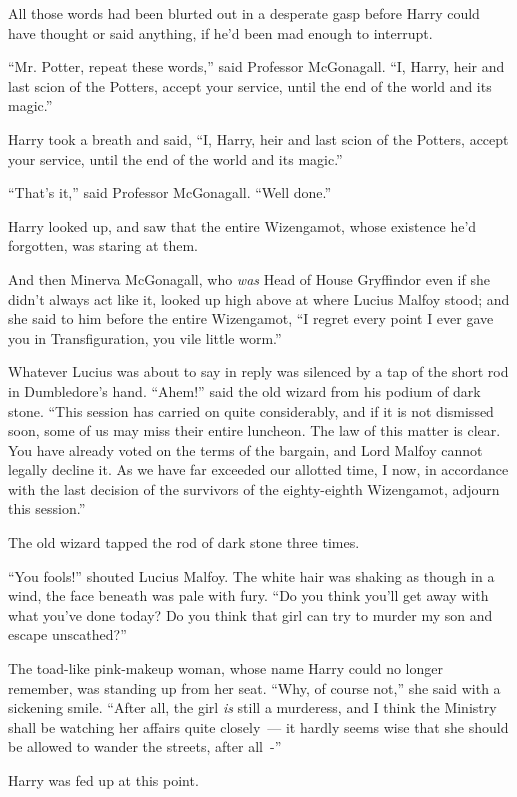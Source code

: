 All those words had been blurted out in a desperate gasp before Harry could have thought or said anything, if he'd been mad enough to interrupt.

``Mr. Potter, repeat these words,'' said Professor McGonagall. ``I, Harry, heir and last scion of the Potters, accept your service, until the end of the world and its magic.''

Harry took a breath and said, ``I, Harry, heir and last scion of the Potters, accept your service, until the end of the world and its magic.''

``That's it,'' said Professor McGonagall. ``Well done.''

Harry looked up, and saw that the entire Wizengamot, whose existence he'd forgotten, was staring at them.

And then Minerva McGonagall, who \emph{was} Head of House Gryffindor even if she didn't always act like it, looked up high above at where Lucius Malfoy stood; and she said to him before the entire Wizengamot, ``I regret every point I ever gave you in Transfiguration, you vile little worm.''

Whatever Lucius was about to say in reply was silenced by a tap of the short rod in Dumbledore's hand. ``Ahem!'' said the old wizard from his podium of dark stone. ``This session has carried on quite considerably, and if it is not dismissed soon, some of us may miss their entire luncheon. The law of this matter is clear. You have already voted on the terms of the bargain, and Lord Malfoy cannot legally decline it. As we have far exceeded our allotted time, I now, in accordance with the last decision of the survivors of the eighty-eighth Wizengamot, adjourn this session.''

The old wizard tapped the rod of dark stone three times.

``You fools!'' shouted Lucius Malfoy. The white hair was shaking as though in a wind, the face beneath was pale with fury. ``Do you think you'll get away with what you've done today? Do you think that girl can try to murder my son and escape unscathed?''

The toad-like pink-makeup woman, whose name Harry could no longer remember, was standing up from her seat. ``Why, of course not,'' she said with a sickening smile. ``After all, the girl \emph{is} still a murderess, and I think the Ministry shall be watching her affairs quite closely~--- it hardly seems wise that she should be allowed to wander the streets, after all~-''

Harry was fed up at this point.

